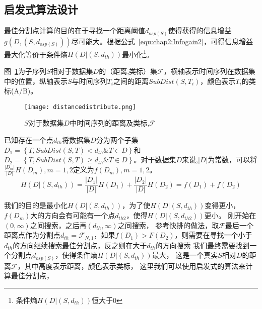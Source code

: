 {\color{red}{这一块关于原始算法再说点，尽量说为什么时间很长.将这个说成时间复杂度可以和最高时间复杂度可以比拟的环节}}

\subsection{启发式算法设计}

{\color{red}{这一部分需要怎么叙述会更清晰一些}}


最佳分割点计算的目的在于寻找一个距离阈值$d_{osp(S)}$使得获得的信息增益$g(D,(S,d_{osp(S)}))$尽可能大。根据公式~\ref{equ:chap2:Infogain2}，可得信息增益最大化等价于条件熵$H(D|(S,d_{th}))$最小化\footnote{条件熵$H(D|(S,d_{th}))$恒大于$0$}。

图~\ref{fig:distancedistribute}为子序列$S$相对于数据集$D$的（距离,类标）集$\mathcal{F}$，横轴表示时间序列在数据集中的位置，纵轴表示$S$与时间序列$T_i$之间的距离$SubDist(S,T_i)$，颜色表示$T_i$的类标(A/B)。
\begin{figure}[H] %
	\centering
	\texttt{[image: distancedistribute.png]}
	\caption{$S$对于数据集$D$中时间序列的距离及类标,$\mathcal{F}$}
	\label{fig:distancedistribute}
\end{figure}

已知存在一个点$d_{th}$将数据集$D$分为两个子集$D_1 = \left\lbrace T,SubDist(S,T)<d_{th} \& T\in D\right\rbrace $和$D_2 = \left\lbrace T,SubDist(S,T) \geq d_{th}\& T\in D\right\rbrace$。对于数据集$D$来说,$|D|$为常数，可以将$\frac{|D_m|}{|D|}H(D_m),m=1,2$定义为$f(D_m),m=1,2$。
\begin{equation}
\label{equ:chap4:ConditionalEntropy}
H(D|(S,d_{th})) = \frac{|D_1|}{|D|}H(D_1)+\frac{|D_2|}{|D|}H(D_2) = f(D_1) + f(D_2)
\end{equation}

我们的目的是最小化$H(D|(S,d_{th}))$，为了使$H(D|(S,d_{th}))$变得更小，$f(D_m)$大的方向会有可能有一个点$d_{th2}$，使得$H(D|(S,d_{th2}))$更小。
刚开始在$(0,\infty)$之间搜索，之后再$(d_{th},\infty)$之间搜索，
参考快排的做法，取$\mathcal{F}$最后一个距离点作为分割点$d_{th}=\mathcal{F}_{N,1}$，如果$f(D_1)>F(D_2)$，则需要在寻找一个小于$d_{th}$的方向继续搜索最佳分割点，反之则在大于$d_{th}$的方向搜索
我们最终需要找到一个分割点$d_{osp(S)}$，使得条件熵$H(D|(S,d_{th}))$最大，
这是一个真实$S$相对$D$的距离$\mathcal{F}$，其中高度表示距离，颜色表示类标，
这里我们可以使用启发式的算法来计算最佳分割点，  

{\color{red}{提及一下最佳分割点的搜索方式}}

